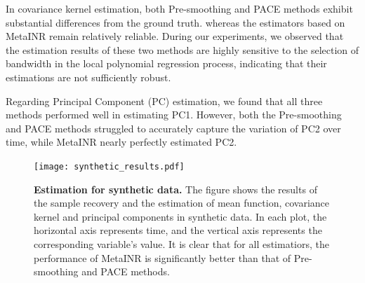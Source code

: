 \documentclass{article}
\begin{document}
In covariance kernel estimation, both Pre-smoothing and PACE methods exhibit substantial differences from the ground truth. 
whereas the estimators based on MetaINR remain relatively reliable.
During our experiments, we observed that the estimation results of these two methods are highly sensitive to the selection of bandwidth in the local polynomial regression process, 
indicating that their estimations are not sufficiently robust.

Regarding Principal Component (PC) estimation, we found that all three methods performed well in estimating PC1. 
However, both the Pre-smoothing and PACE methods struggled to accurately capture the variation of PC2 over time, while MetaINR nearly perfectly estimated PC2.

\begin{figure}[htb]
  \centering
  \texttt{[image: synthetic\_results.pdf]}
  \caption{\textbf{Estimation for synthetic data.} The figure shows the results of the sample recovery and the estimation of mean function, covariance kernel and principal components in synthetic data. 
  In each plot, the horizontal axis represents time, and the vertical axis represents the corresponding variable's value. 
  It is clear that for all estimatiors, the performance of MetaINR is significantly better than that of Pre-smoothing and PACE methods. }
  \label{Estimation for synthetic data}
\end{figure}






\end{document}
